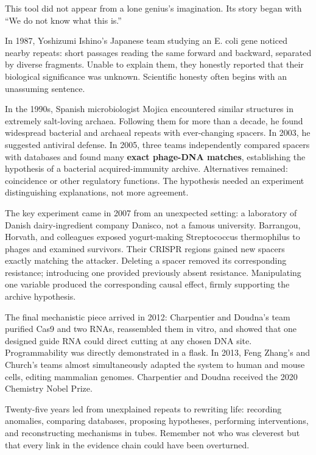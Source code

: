 \begin{zhengju}
This tool did not appear from a lone genius's imagination. Its story began with ``We do not know what this is.''

In 1987, Yoshizumi Ishino's Japanese team studying an E. coli gene noticed nearby repeats: short passages reading the same forward and backward, separated by diverse fragments. Unable to explain them, they honestly reported that their biological significance was unknown. Scientific honesty often begins with an unassuming sentence.

In the 1990s, Spanish microbiologist Mojica encountered similar structures in extremely salt-loving archaea. Following them for more than a decade, he found widespread bacterial and archaeal repeats with ever-changing spacers. In 2003, he suggested antiviral defense. In 2005, three teams independently compared spacers with databases and found many \textbf{exact phage-DNA matches}, establishing the hypothesis of a bacterial acquired-immunity archive. Alternatives remained: coincidence or other regulatory functions. The hypothesis needed an experiment distinguishing explanations, not more agreement.

The key experiment came in 2007 from an unexpected setting: a laboratory of Danish dairy-ingredient company Danisco, not a famous university. Barrangou, Horvath, and colleagues exposed yogurt-making Streptococcus thermophilus to phages and examined survivors. Their CRISPR regions gained new spacers exactly matching the attacker. Deleting a spacer removed its corresponding resistance; introducing one provided previously absent resistance. Manipulating one variable produced the corresponding causal effect, firmly supporting the archive hypothesis.

The final mechanistic piece arrived in 2012: Charpentier and Doudna's team purified Cas9 and two RNAs, reassembled them in vitro, and showed that one designed guide RNA could direct cutting at any chosen DNA site. Programmability was directly demonstrated in a flask. In 2013, Feng Zhang's and Church's teams almost simultaneously adapted the system to human and mouse cells, editing mammalian genomes. Charpentier and Doudna received the 2020 Chemistry Nobel Prize.

Twenty-five years led from unexplained repeats to rewriting life: recording anomalies, comparing databases, proposing hypotheses, performing interventions, and reconstructing mechanisms in tubes. Remember not who was cleverest but that every link in the evidence chain could have been overturned.
\end{zhengju}

